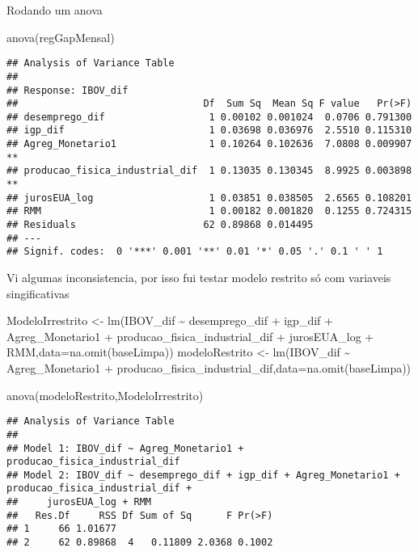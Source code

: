 \documentclass[
]{article}
\newenvironment{Shaded}{\begin{snugshade}}{\end{snugshade}}
\newcommand{\AttributeTok}[1]{\textcolor[rgb]{0.77,0.63,0.00}{#1}}
\newcommand{\FunctionTok}[1]{\textcolor[rgb]{0.00,0.00,0.00}{#1}}
\newcommand{\NormalTok}[1]{#1}
\newcommand{\OtherTok}[1]{\textcolor[rgb]{0.56,0.35,0.01}{#1}}
\newcommand{\SpecialCharTok}[1]{\textcolor[rgb]{0.00,0.00,0.00}{#1}}
\begin{document}
Rodando um anova

\begin{Shaded}
\begin{Highlighting}[]
\FunctionTok{anova}\NormalTok{(regGapMensal)}
\end{Highlighting}
\end{Shaded}

\begin{verbatim}
## Analysis of Variance Table
## 
## Response: IBOV_dif
##                                Df  Sum Sq  Mean Sq F value   Pr(>F)   
## desemprego_dif                  1 0.00102 0.001024  0.0706 0.791300   
## igp_dif                         1 0.03698 0.036976  2.5510 0.115310   
## Agreg_Monetario1                1 0.10264 0.102636  7.0808 0.009907 **
## producao_fisica_industrial_dif  1 0.13035 0.130345  8.9925 0.003898 **
## jurosEUA_log                    1 0.03851 0.038505  2.6565 0.108201   
## RMM                             1 0.00182 0.001820  0.1255 0.724315   
## Residuals                      62 0.89868 0.014495                    
## ---
## Signif. codes:  0 '***' 0.001 '**' 0.01 '*' 0.05 '.' 0.1 ' ' 1
\end{verbatim}

Vi algumas inconsistencia, por isso fui testar modelo restrito só com
variaveis singificativas

\begin{Shaded}
\begin{Highlighting}[]
\NormalTok{ModeloIrrestrito }\OtherTok{\textless{}{-}} \FunctionTok{lm}\NormalTok{(IBOV\_dif }\SpecialCharTok{\textasciitilde{}}\NormalTok{ desemprego\_dif }\SpecialCharTok{+}\NormalTok{ igp\_dif }\SpecialCharTok{+}\NormalTok{ Agreg\_Monetario1 }\SpecialCharTok{+}\NormalTok{ producao\_fisica\_industrial\_dif }\SpecialCharTok{+}
\NormalTok{    jurosEUA\_log }\SpecialCharTok{+}\NormalTok{ RMM,}\AttributeTok{data=}\FunctionTok{na.omit}\NormalTok{(baseLimpa))}
\NormalTok{modeloRestrito }\OtherTok{\textless{}{-}} \FunctionTok{lm}\NormalTok{(IBOV\_dif }\SpecialCharTok{\textasciitilde{}}\NormalTok{ Agreg\_Monetario1 }\SpecialCharTok{+}\NormalTok{ producao\_fisica\_industrial\_dif,}\AttributeTok{data=}\FunctionTok{na.omit}\NormalTok{(baseLimpa))}

\FunctionTok{anova}\NormalTok{(modeloRestrito,ModeloIrrestrito)}
\end{Highlighting}
\end{Shaded}

\begin{verbatim}
## Analysis of Variance Table
## 
## Model 1: IBOV_dif ~ Agreg_Monetario1 + producao_fisica_industrial_dif
## Model 2: IBOV_dif ~ desemprego_dif + igp_dif + Agreg_Monetario1 + producao_fisica_industrial_dif + 
##     jurosEUA_log + RMM
##   Res.Df     RSS Df Sum of Sq      F Pr(>F)
## 1     66 1.01677                           
## 2     62 0.89868  4   0.11809 2.0368 0.1002
\end{verbatim}
\end{document}

